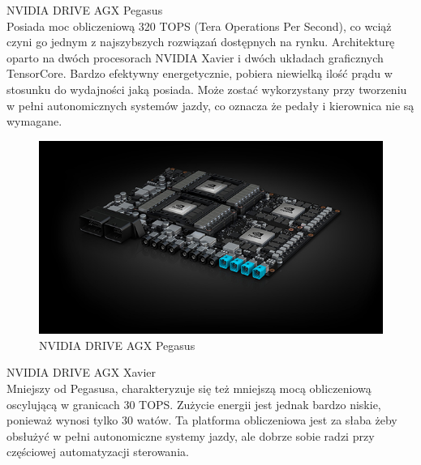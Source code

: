 \begin{enumerate*}
\item NVIDIA DRIVE AGX Pegasus \\
Posiada moc obliczeniową 320 TOPS (Tera Operations Per Second), co wciąż czyni go jednym z najszybszych rozwiązań dostępnych na rynku.
Architekturę oparto na dwóch procesorach NVIDIA Xavier i dwóch układach graficznych TensorCore. Bardzo efektywny energetycznie, pobiera niewielką ilość prądu w stosunku do wydajności jaką posiada. Może zostać wykorzystany przy tworzeniu w pełni autonomicznych systemów jazdy, co oznacza że pedały i kierownica nie są wymagane. \\

\begin{figure}[h]
\begin{center}
\includegraphics[width=15cm]{resources/figures/nv-drive-pegasus.jpg}
\caption{NVIDIA DRIVE AGX Pegasus}
\end{center}
\end{figure}
\newpage
\item NVIDIA DRIVE AGX Xavier \\
Mniejszy od Pegasusa, charakteryzuje się też mniejszą mocą obliczeniową oscylującą w granicach 30 TOPS. Zużycie energii jest jednak bardzo niskie, ponieważ wynosi tylko 30 watów. Ta platforma obliczeniowa jest za słaba żeby obsłużyć w pełni autonomiczne systemy jazdy, ale dobrze sobie radzi przy częściowej automatyzacji sterowania. \\


\end{enumerate*}
